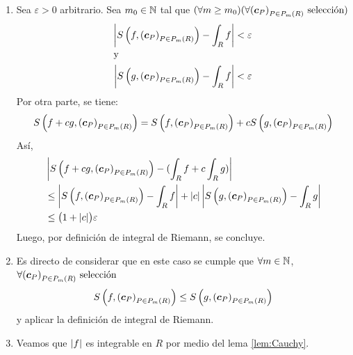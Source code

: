 \begin{demostracion}
\begin{enumerate}
    \item Sea $ \varepsilon > 0 $ arbitrario. Sea $m_0\in \mathbb{N}$ tal
    que $ (\forall m \geq m_0)(\forall {(\boldsymbol{c}_P)}_{P \in P_{m}(R)} \allowbreak \text{ selecci\'on} ) $
    \begin{align*}
        \left\lvert S\left(f, {(\boldsymbol{c}_P)}_{P \in P_{m}(R)}\right) - \int_R f \right\rvert <
        \varepsilon \\
        \intertext{y}
        \left\lvert S\left(g, {(\boldsymbol{c}_P)}_{P \in P_{m}(R)}\right) - \int_R f \right\rvert < \varepsilon
    \end{align*}
    Por otra parte, se tiene:
        \[ S\left(f+cg, {(\boldsymbol{c}_P)}_{P \in P_{m}(R)}\right) = S\left(f, {(\boldsymbol{c}_P)}_{P \in P_{m}(R)}\right)
        + cS\left(g, {(\boldsymbol{c}_P)}_{P \in P_{m}(R)}\right)\]
    As\'i,
    \begin{align*}
&    \left\lvert S\left(f+cg, {(\boldsymbol{c}_P)}_{P \in P_{m}(R)}\right) -
            (\int_R f + c \int_R g)\right\rvert \\
        &\leq \left\lvert S\left(f, {(\boldsymbol{c}_P)}_{P \in P_{m}(R)}\right) - \int_R f \right\rvert +
            \left\lvert c\right\rvert \left\lvert S\left(g, {(\boldsymbol{c}_P)}_{P \in P_{m}(R)}\right) - \int_R g \right\rvert \\
        &\leq \bigl(1+\left\lvert c\right\rvert\bigr) \varepsilon
\end{align*}
    Luego, por definici\'on de integral de Riemann, se concluye.
    \item Es directo de considerar que en este caso se cumple que
    $ \forall  m\in \mathbb{N}$, $\forall {(\boldsymbol{c}_P)}_{P \in P_{m}(R)} \allowbreak \text{ selecci\'on}$
        \[ S\left(f, {(\boldsymbol{c}_P)}_{P \in P_{m}(R)}\right) \leq S\left(g, {(\boldsymbol{c}_P)}_{P \in P_{m}(R)}\right)
        \]
    y aplicar la definici\'on de integral de Riemann.
    \item Veamos que $ \left\lvert f\right\rvert $ es integrable en $ R $ por medio
    del lema \ref{lem:Cauchy}.


\end{enumerate}
\end{demostracion}
